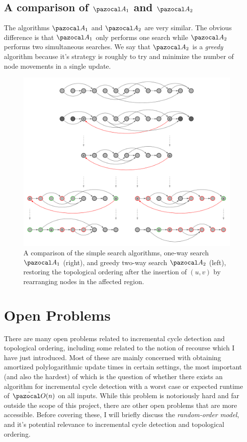 \documentclass{report}
\begin{document}
\subsection{A comparison of $\pazocal A_1$ and $\pazocal A_2$}

The algorithms $\pazocal A_1$ and $\pazocal A_2$ are very similar. The obvious difference is that $\pazocal A_1$ only performs one search while $\pazocal A_2$ performs two simultaneous searches. We say that $\pazocal A_2$ is a \textit{greedy} algorithm because it's strategy is roughly to try and minimize the number of node movements in a single update.

\begin{figure}[htp]
    \centering
    \includegraphics[width=12cm]{Simple Algos.png}
    \caption{A comparison of the simple search algorithms, one-way search $\pazocal A_1$ (right), and greedy two-way search $\pazocal A_2$ (left), restoring the topological ordering after the insertion of $(u,v)$ by rearranging nodes in the affected region.}
    \label{fig:simplesearch}
\end{figure}

\section{Open Problems}

There are many open problems related to incremental cycle detection and topological ordering, including some related to the notion of recourse which I have just introduced. Most of these are mainly concerned with obtaining amortized polylogarithmic update times in certain settings, the most important (and also the hardest) of which is the question of whether there exists an algorithm for incremental cycle detection with a worst case or expected runtime of $\tilde{\pazocal O}(n)$ on all inputs. While this problem is notoriously hard and far outside the scope of this project, there are other open problems that are more accessible. Before covering these, I will briefly discuss the \textit{random-order model}, and it's potential relevance to incremental cycle detection and topological ordering.
\end{document}
